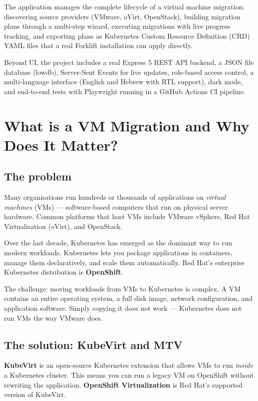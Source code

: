 \documentclass[12pt,a4paper]{article}
\begin{document}
The application manages the complete lifecycle of a virtual machine migration: discovering source providers (VMware, oVirt, OpenStack), building migration plans through a multi-step wizard, executing migrations with live progress tracking, and exporting plans as Kubernetes Custom Resource Definition (CRD) YAML files that a real Forklift installation can apply directly.

Beyond UI, the project includes a real Express 5 REST API backend, a JSON file database (lowdb), Server-Sent Events for live updates, role-based access control, a multi-language interface (English and Hebrew with RTL support), dark mode, and end-to-end tests with Playwright running in a GitHub Actions CI pipeline.

\section{What is a VM Migration and Why Does It Matter?}

\subsection{The problem}

Many organisations run hundreds or thousands of applications on \emph{virtual machines} (VMs) — software-based computers that run on physical server hardware. Common platforms that host VMs include VMware vSphere, Red Hat Virtualisation (oVirt), and OpenStack.

Over the last decade, Kubernetes has emerged as the dominant way to run modern workloads. Kubernetes lets you package applications in containers, manage them declaratively, and scale them automatically. Red Hat's enterprise Kubernetes distribution is \textbf{OpenShift}.

The challenge: moving workloads from VMs to Kubernetes is complex. A VM contains an entire operating system, a full disk image, network configuration, and application software. Simply copying it does not work — Kubernetes does not run VMs the way VMware does.

\subsection{The solution: KubeVirt and MTV}

\textbf{KubeVirt} is an open-source Kubernetes extension that allows VMs to run \emph{inside} a Kubernetes cluster. This means you can run a legacy VM on OpenShift without rewriting the application. \textbf{OpenShift Virtualization} is Red Hat's supported version of KubeVirt.
\end{document}
